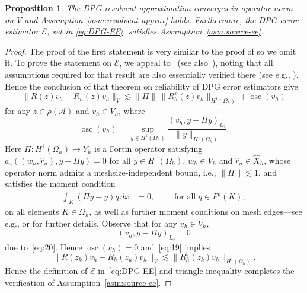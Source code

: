 \documentclass[12pt, oneside, reqno]{amsart}
\newtheorem{proposition}[theorem]{Proposition}
\theoremstyle{remark}
\renewcommand{\hat}{\widehat}
\DeclareMathOperator{\osc}{osc}
\newcommand{\EE}{\mathcal{E}}
\newcommand{\Ac}{\mathcal{A}}
\newcommand{\veps}{\varepsilon}
\newcommand{\vpi}{\varPi}
\newcommand{\om}{\Omega}
\newcommand{\oh}{\Omega_h}
\begin{document}
\begin{proposition}
  The DPG resolvent approximation converges in operator norm on $V$
  and Assumption~\ref{asm:resolvent-approx} holds. Furthermore, the
  DPG error estimator $\EE$, set in \eqref{eq:DPG-EE}, satisfies
  Assumption~\ref{asm:source-ee}.
\end{proposition}
\begin{proof}
  The proof of the first statement is very similar to the proof of
  \cite[Lemma~3.4]{GopGruOvaPar2019-1} so we omit it. To prove the
  statement on $\EE$, we appeal to~\cite[Theorem~6.4]{DemGop2025-1}
  (see also~\cite{CarDemGop2014-1}), noting that all assumptions
  required for that result are also essentially verified there (see
  e.g., \cite[Example~4.2]{DemGop2025-1}). Hence the conclusion of
  that theorem on reliability of DPG error estimators give
  \begin{equation}
    \label{eq:19}
    \| R(z) v_h - R_h(z) v_h \|_{V} 
    \lesssim  \| \vpi \| \,\| R_h^\veps(z) v_h \|_{H^1(\om_h)} + \osc(v_h)
  \end{equation}
  for any $z \in \rho(\Ac)$ and $v_h \in V_h$, where 
  \[
    \osc(v_h) = \sup_{y \in H^1(\om_h)}
    \frac{ (v_h, y - \vpi y )_{L_2}}{ \| y \|_{H^1(\om_h)}}.
  \]
  Here $\vpi: H^1(\oh) \to Y_h$ is a Fortin operator satisfying
  $a_z( (w_h, \hat r_n), y - \vpi y )=0$ for all $y \in H^1(\oh)$, $w_h \in V_h$ and
  $ \hat r_n \in \hat X_h$, whose operator norm admits a
  meshsize-independent bound, i.e.,  $\|\vpi \| \lesssim 1$, and satisfies the
  moment condition
  \begin{align}
    \label{eq:20}
    \int_K (\vpi y - y) q \, dx & = 0, \qquad \text{ for all } q \in P^k(K),
  \end{align}
  on all elements $K \in \om_h$,
  as well as further moment conditions on  mesh edges---see e.g.,
  \cite[Theorem~5.4]{DemGop2025-1} or \cite{GopalQiu14} for further details.
  Observe that
  for any $v_h \in V_h$,
  \[
    (v_h, y - \vpi y )_{L_2} = 0 
  \]
  due to~\eqref{eq:20}. Hence $\osc(v_h) = 0$ and~\eqref{eq:19} implies
  \[
    \| R(z_k) v_h - R_h(z_k) v_h \|_{V} 
    \lesssim\| R_h^\veps(z_k) v_h \|_{H^1(\oh)}.
  \]
  Hence the definition of $\EE$ in~\eqref{eq:DPG-EE} and triangle
  inequality completes the verification of
  Assumption~\ref{asm:source-ee}.
\end{proof}
\end{document}
